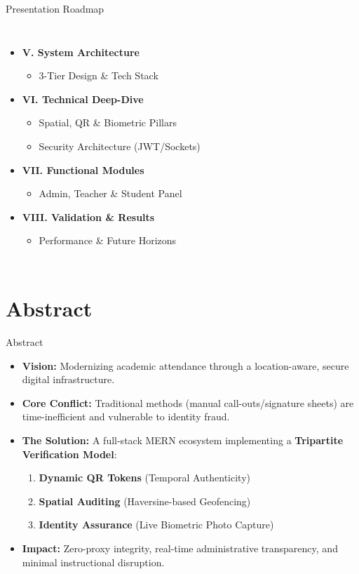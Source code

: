 \documentclass[11pt, aspectratio=169]{beamer}
\begin{document}
\begin{frame}{Presentation Roadmap}
\begin{columns}[t]
        \begin{itemize}
            \item \textbf{V. System Architecture}
            \begin{itemize}
                \item 3-Tier Design \& Tech Stack
            \end{itemize}
            \item \textbf{VI. Technical Deep-Dive}
            \begin{itemize}
                \item Spatial, QR \& Biometric Pillars
                \item Security Architecture (JWT/Sockets)
            \end{itemize}
            \item \textbf{VII. Functional Modules}
            \begin{itemize}
                \item Admin, Teacher \& Student Panel
            \end{itemize}
            \item \textbf{VIII. Validation \& Results}
            \begin{itemize}
                \item Performance & Future Horizons
            \end{itemize}
        \end{itemize}
    \end{columns}
\end{frame}

\section{Abstract}
\begin{frame}{Abstract}
    \begin{itemize}
        \item \textbf{Vision:} Modernizing academic attendance through a location-aware, secure digital infrastructure.
        \item \textbf{Core Conflict:} Traditional methods (manual call-outs/signature sheets) are time-inefficient and vulnerable to identity fraud.
        \item \textbf{The Solution:} A full-stack MERN ecosystem implementing a \textbf{Tripartite Verification Model}:
        \begin{enumerate}
            \item \textbf{Dynamic QR Tokens} (Temporal Authenticity)
            \item \textbf{Spatial Auditing} (Haversine-based Geofencing)
            \item \textbf{Identity Assurance} (Live Biometric Photo Capture)
        \end{enumerate}
        \item \textbf{Impact:} Zero-proxy integrity, real-time administrative transparency, and minimal instructional disruption.
    \end{itemize}
\end{frame}
\end{document}
